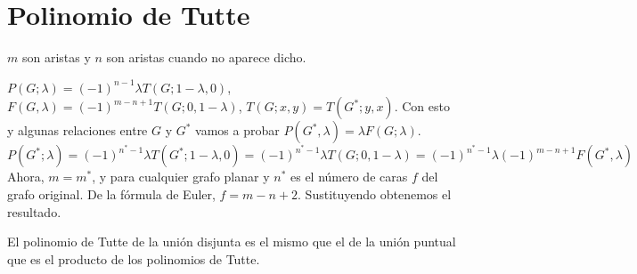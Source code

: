 \documentclass[TGyGC.tex]{subfiles}
\begin{document}
\section{Polinomio de Tutte}
$m$ son aristas y $n$ son aristas cuando no aparece dicho. 

$P(G;\lambda)=(-1)^{n-1}\lambda T(G;1-\lambda,0)$, $F(G,\lambda)=(-1)^{m-n+1}T(G;0,1-\lambda)$, $T(G;x,y)=T(G^*;y,x)$. Con esto y algunas relaciones entre $G$ y $G^*$ vamos a probar $P(G^*,\lambda)=\lambda F(G;\lambda)$. 
\[
P(G^*;\lambda)=(-1)^{n^*-1}\lambda T(G^*;1-\lambda,0)=(-1)^{n^*-1}\lambda T(G;0,1-\lambda)=(-1)^{n^*-1}\lambda (-1)^{m-n+1}F(G^*,\lambda)
\]
Ahora, $m=m^*$, y para cualquier grafo planar y $n^*$ es el número de caras $f$ del grafo original. De la fórmula de Euler, $f=m-n+2$. Sustituyendo obtenemos el resultado. 

El polinomio de Tutte de la unión disjunta es el mismo que el de la unión puntual que es el producto de los polinomios de Tutte.
\end{document}
